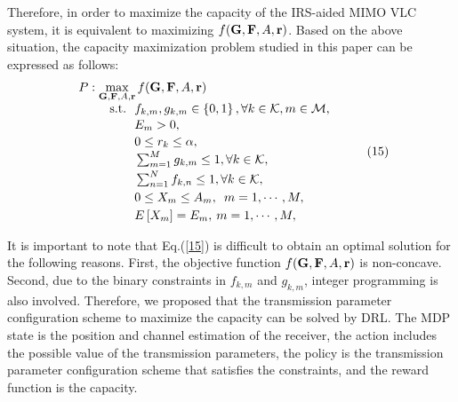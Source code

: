 \documentclass[conference]{IEEEtran}
\begin{document}
   Therefore, in order to maximize the capacity of the IRS-aided MIMO VLC 
   system, it is equivalent to maximizing $f({\bf{G}},{\bf{F}},A,{\bf{r}})$. 
   Based on the above situation, 
   the capacity maximization problem studied 
   in this paper can be expressed as follows:
     \begin{equation}
     \begin{array}{l}
     P: \mathop {\max }\limits_{{\bf{G}},{\bf{F}},A,{\bf{r}}} f({\bf{G}},{\bf{F}},A,{\bf{r}})
     \\ \begin{array}{l}
     \quad \quad {\rm{s}}{\rm{.t}}{\rm{.    }}\,\,\,\,{f_{k,m}},{g_{k,m}} \in \left\{ {0,1} \right\},{\rm{  }}\forall k \in {\cal K},{\rm{ }}m \in {\cal M},\\[1pt]
     \quad\quad\quad\quad{\rm{        }}{E_m} > 0,\\ [1.5pt]
     \quad\quad\quad\quad{\rm{        }}0 \le {r_k} \le \alpha ,\\[1pt]
     \quad\quad\quad\quad{\rm{        }}\sum\nolimits_{m = 1}^M {{g_{k,m}}}  \le 1,{\rm{ }}\forall k \in {\cal K},\\[2.5pt]
     \quad\quad\quad\quad{\rm{        }}\sum\nolimits_{n = 1}^N {{f_{k,n}}}  \le 1,{\rm{ }}\forall k \in {\cal K},\\[2.5pt]
     \quad\quad\quad\quad{\rm{        }}0 \le {X_m} \le {A_m},{\kern 1pt} {\kern 1pt} {\kern 1pt} {\kern 1pt} {\kern 1pt} m = 1, \cdots ,M,\\ [2.5pt]
     \quad\quad\quad\quad{\rm{        }}E\left[ {{X_m}} \right] = {E_m},{\rm{ }}{\kern 1pt} {\kern 1pt} m = 1, \cdots ,M,
     \end{array}
     \end{array}
     \tag{15}\label{15}
     \end{equation}

   It is important to note that Eq.(\ref{15}) is difficult to obtain an optimal 
   solution for the following reasons. First, the objective function 
   $f({\bf{G}},{\bf{F}},A,{\bf{r}})$ is 
   non-concave. Second, due to the binary constraints in ${f_{k,m}}$ and ${g_{k,m}}$, 
   integer 
   programming is also involved. Therefore, we proposed that the transmission 
   parameter 
   configuration scheme to maximize the capacity can be solved by DRL. 
   The MDP state is the position and channel estimation of the receiver, the 
   action includes the possible value of the transmission parameters, the 
   policy is the transmission parameter configuration scheme that satisfies 
   the constraints, and the reward function is the capacity.
\end{document}
